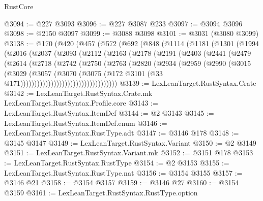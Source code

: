\begin{lexlean}{RustCore}
\begin{coremodule}
@3094 := @227 @3093
@3096 := @227 @3087 @233
@3097 := @3094 @3096
@3098 := @2150 @3097
@3099 := @3088 @3098
@3101 := @3031 (@3080 @3099)
@3138 := @170
    (@420
      (@457
        (@572
          (@692
            (@848
              (@1114
                (@1181
                  (@1301
                    (@1994
                      (@2016
                        (@2037
                          (@2093
                            (@2112
                              (@2163
                                (@2178
                                  (@2191
                                    (@2403
                                      (@2441
                                        (@2479
                                          (@2614
                                            (@2718
                                              (@2742
                                                (@2750
                                                  (@2763
                                                    (@2820
                                                      (@2934
                                                        (@2959
                                                          (@2990
                                                            (@3015
                                                              (@3029
                                                                (@3057
                                                                  (@3070
                                                                    (@3075
                                                                      (@172
                                                                        @3101
                                                                        (@33
                                                                          @171)))))))))))))))))))))))))))))))))))
@3139 := LexLeanTarget.RustSyntax.Crate
@3142 := LexLeanTarget.RustSyntax.Crate.mk LexLeanTarget.RustSyntax.Profile.core
@3143 := LexLeanTarget.RustSyntax.ItemDef
@3144 := @2 @3143
@3145 := LexLeanTarget.RustSyntax.ItemDef.enum
@3146 := LexLeanTarget.RustSyntax.RustType.adt
@3147 := @3146 @178
@3148 := @3145 @3147
@3149 := LexLeanTarget.RustSyntax.Variant
@3150 := @2 @3149
@3151 := LexLeanTarget.RustSyntax.Variant.mk
@3152 := @3151 @178
@3153 := LexLeanTarget.RustSyntax.RustType
@3154 := @2 @3153
@3155 := LexLeanTarget.RustSyntax.RustType.nat
@3156 := @3154 @3155
@3157 := @3146 @21
@3158 := @3154 @3157
@3159 := @3146 @27
@3160 := @3154 @3159
@3161 := LexLeanTarget.RustSyntax.RustType.option

\end{coremodule}
\end{lexlean}
